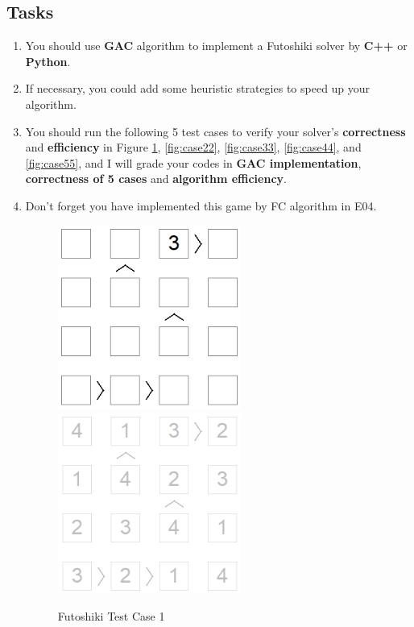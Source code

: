 ﻿\documentclass[a4paper, 11pt]{article}
\begin{document}
\subsection{Tasks}

\begin{enumerate}
\item You should use \textbf{GAC} algorithm to implement a Futoshiki solver by \textbf{C++} or \textbf{Python}.
\item If necessary, you could add some heuristic strategies to speed up your algorithm. 
\item You should run the following 5 test cases to verify your solver's \textbf{correctness} and \textbf{efficiency} in Figure \ref{fig:case11}, \ref{fig:case22}, \ref{fig:case33}, \ref{fig:case44}, and \ref{fig:case55}, and I will grade your codes in \textbf{GAC implementation}, \textbf{correctness of 5 cases} and \textbf{algorithm efficiency}.
\item Don't forget you have implemented this game by FC algorithm in E04.
    \begin{figure}[htbp]
    \centering
    \includegraphics[width=6cm]{Pic/f1}
    \qquad
    \includegraphics[width=6cm]{Pic/f1s}
    \caption{Futoshiki Test Case 1}
    \label{fig:case11}
  \end{figure}
        \begin{figure}[htbp]
    \centering

\end{figure}
\end{enumerate}
\end{document}
